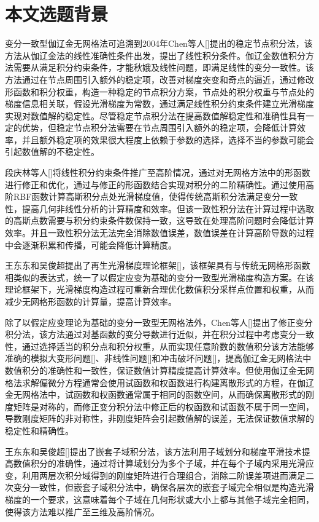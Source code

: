 \section{本文选题背景}
变分一致型伽辽金无网格法可追溯到2004年Chen等人[]提出的稳定节点积分法，该方法从伽辽金法的线性准确性条件出发，提出了线性积分条件。伽辽金数值积分方法需要从满足积分约束条件，才能秋娥及线性问题，即满足线性的变分一致性。该方法通过在节点周围引入额外的稳定项，改善对梯度突变和奇点的逼近，通过修改形函数和积分权重，构造一种稳定的节点积分方案，节点处的积分权重与节点处的梯度信息相关联，假设光滑梯度为常数，通过满足线性积分约束条件建立光滑梯度实现对数值解的稳定性。尽管稳定节点积分法在提高数值解稳定性和准确性具有一定的优势，但稳定节点积分法需要在节点周围引入额外的稳定项，会降低计算效率，并且额外稳定项的效果很大程度上依赖于参数的选择，选择不当的参数可能会引起数值解的不稳定性。\par
段庆林等人[]将线性积分约束条件推广至高阶情况，通过对无网格方法中的形函数进行修正和优化，通过与修正的形函数结合实现对积分的二阶精确性。通过使用高阶RBF函数计算高斯积分点处光滑梯度值，使得传统高斯积分法满足变分一致性，提高几何非线性分析的计算精度和效率。但该一致性积分法在计算过程中选取的高斯点数需要与积分约束条件数保持一致，这导致在处理高阶问题时会降低计算效率。并且一致性积分法无法完全消除数值误差，数值误差在计算高阶导数的过程中会逐渐积累和传播，可能会降低计算精度。\par
王东东和吴俊超提出了再生光滑梯度理论框架[]，该框架具有与传统无网格形函数相类似的表达式，统一了以假定应变为基础的变分一致型光滑梯度构造方案。在该理论框架下，光滑梯度构造过程可重新合理优化数值积分采样点位置和权重，从而减少无网格形函数的计算量，提高计算效率。\par
除了以假定应变理论为基础的变分一致型无网格法外，Chen等人[]提出了修正变分积分法，该方法通过对基函数的变分导数进行近似，并在积分过程中考虑变分一致性，通过选择适当的积分点和积分权重，从而实现任意阶数的数值积分该方法能够准确的模拟大变形问题[]、非线性问题[]和冲击破坏问题[]，提高伽辽金无网格法中数值积分的准确性和一致性，保证数值计算精度提高计算效率。但使用伽辽金无网格法求解偏微分方程通常会使用试函数和权函数进行构建离散形式的方程，在伽辽金无网格法中，试函数和权函数通常属于相同的函数空间，从而确保离散形式的刚度矩阵是对称的，而修正变分积分法中修正后的权函数和试函数不属于同一空间，导数刚度矩阵的非对称性，非刚度矩阵会引起数值解的误差，无法保证数值求解的稳定性和精确性。\par
王东东和吴俊超[]提出了嵌套子域积分法，该方法利用子域划分和梯度平滑技术提高数值积分的准确性，通过将计算域划分为多个子域，并在每个子域内采用光滑应变，利用两层次积分域得到的刚度矩阵进行合理组合，消除二阶误差项进而满足二次变分一致性，但嵌套子域积分法中，确保各层次的嵌套子域完全相似是构造光滑梯度的一个要求，这意味着每个子域在几何形状或大小上都与其他子域完全相同，使得该方法难以推广至三维及高阶情况。
